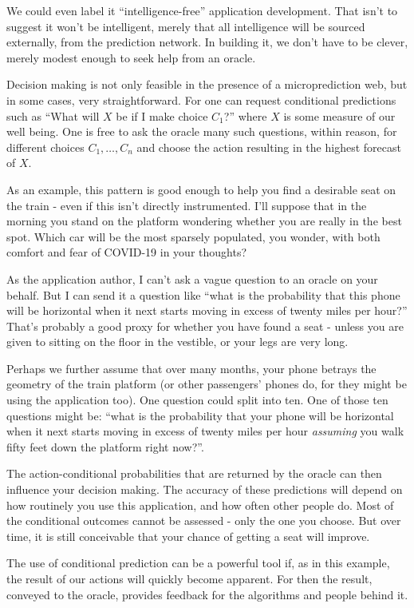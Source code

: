 We could even label it ``intelligence-free'' application development. That isn't to suggest it won't be intelligent, merely that all intelligence will be sourced externally, from the prediction network. In building it, we don't have to be clever, merely modest enough to seek help from an oracle. 

Decision making is not only feasible in the presence of a microprediction web, but in some cases, very straightforward. For one can request conditional predictions such as ``What will $X$ be if I make choice $C_1$?'' where $X$ is some measure of our well being. One is free to ask the oracle many such questions, within reason, for different choices $C_1,\dots,C_n$ and choose the action resulting in the highest forecast of $X$. 


As an example, this pattern is good enough to help you find a desirable seat on the train - even if this isn't directly instrumented. I'll suppose that in the morning you stand on the platform wondering whether you are really in the best spot. Which car will be the most sparsely populated, you wonder, with both comfort and fear of COVID-19 in your thoughts? 


As the application author, I can't ask a vague question to an oracle on your behalf. But I can send it a question like ``what is the probability that this phone will be horizontal when it next starts moving in excess of twenty miles per hour?'' That's probably a good proxy for whether you have found a seat - unless you are given to sitting on the floor in the vestible, or your legs are very long. 


Perhaps we further assume that over many months, your phone betrays the geometry of the train platform (or other passengers' phones do, for they might be using the application too). One question could split into ten. One of those ten questions might be: ``what is the probability that your phone will be horizontal when it next starts moving in excess of twenty miles per hour {\em assuming} you walk fifty feet down the platform right now?''. 


The action-conditional probabilities that are returned by the oracle can then influence your decision making. The accuracy of these predictions will depend on how routinely you use this application, and how often other people do. Most of the conditional outcomes cannot be assessed - only the one you choose. But over time, it is still conceivable that your chance of getting a seat will improve. 


The use of conditional prediction can be a powerful tool if, as in this example, the result of our actions will quickly become apparent. For then the result, conveyed to the oracle, provides feedback for the algorithms and people behind it. 


